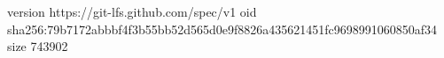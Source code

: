 version https://git-lfs.github.com/spec/v1
oid sha256:79b7172abbbf4f3b55bb52d565d0e9f8826a435621451fc9698991060850af34
size 743902
